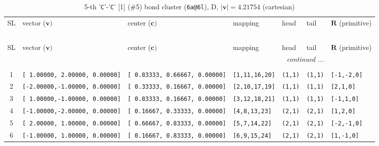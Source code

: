 \documentclass[fleqn,10pt,landscape]{jsarticle}
\begin{document}
\begin{longtable}[l]{cllllll}
\captionsetup{justification=raggedright, singlelinecheck=off}
\caption{5-th '\texttt{C}'-'\texttt{C}' [1] (\#5) bond cluster (\texttt{6a@6l}), D, $|\bm{v}|=4.21754$ (cartesian)}
 \\
 \hline \hline
SL & vector ($\bm{v})$ & center ($\bm{c})$ & mapping & head & tail & $\bm{R}$ (primitive) \\ \hline \endfirsthead

\multicolumn{6}{l}{\tablename\ \thetable{}} \\
 \hline \hline
SL & vector ($\bm{v})$ & center ($\bm{c})$ & mapping & head & tail & $\bm{R}$ (primitive) \\ \hline \endhead

 \hline \hline
\multicolumn{6}{r}{\footnotesize\it continued ...} \\ \endfoot

 \hline \hline
\multicolumn{6}{r}{} \\ \endlastfoot

1 & \texttt{[ 1.00000, 2.00000, 0.00000]} & \texttt{[ 0.83333, 0.66667, 0.00000]} & \texttt{[1,11,16,20]} & \texttt{(1,1)} & \texttt{(1,1)} & \texttt{[-1,-2,0]} \\ \hline
2 & \texttt{[-2.00000,-1.00000, 0.00000]} & \texttt{[ 0.33333, 0.16667, 0.00000]} & \texttt{[2,10,17,19]} & \texttt{(1,1)} & \texttt{(1,1)} & \texttt{[2,1,0]} \\ \hline
3 & \texttt{[ 1.00000,-1.00000, 0.00000]} & \texttt{[ 0.83333, 0.16667, 0.00000]} & \texttt{[3,12,18,21]} & \texttt{(1,1)} & \texttt{(1,1)} & \texttt{[-1,1,0]} \\ \hline
4 & \texttt{[-1.00000,-2.00000, 0.00000]} & \texttt{[ 0.16667, 0.33333, 0.00000]} & \texttt{[4,8,13,23]} & \texttt{(2,1)} & \texttt{(2,1)} & \texttt{[1,2,0]} \\ \hline
5 & \texttt{[ 2.00000, 1.00000, 0.00000]} & \texttt{[ 0.66667, 0.83333, 0.00000]} & \texttt{[5,7,14,22]} & \texttt{(2,1)} & \texttt{(2,1)} & \texttt{[-2,-1,0]} \\ \hline
6 & \texttt{[-1.00000, 1.00000, 0.00000]} & \texttt{[ 0.16667, 0.83333, 0.00000]} & \texttt{[6,9,15,24]} & \texttt{(2,1)} & \texttt{(2,1)} & \texttt{[1,-1,0]} \\
\end{longtable}
\end{document}
